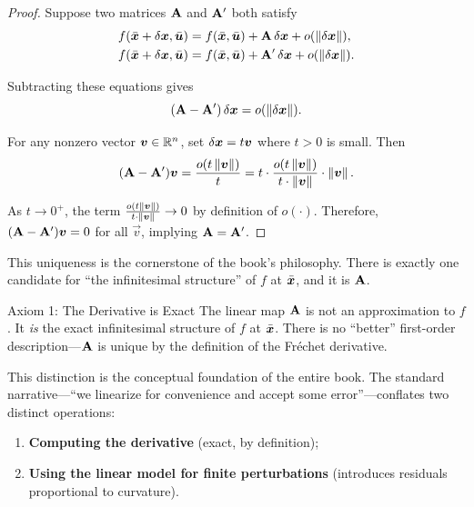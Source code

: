 \begin{proof}
Suppose two matrices $\mathbf{A}$ and $\mathbf{A}'$ both satisfy
\begin{align}
f(\bar{\bm{x}} + \delta\bm{x}, \bar{\bm{u}}) &= f(\bar{\bm{x}}, \bar{\bm{u}}) + \mathbf{A}\,\delta\bm{x} + o(\left\lVert \delta\bm{x} \right\rVert), \\
f(\bar{\bm{x}} + \delta\bm{x}, \bar{\bm{u}}) &= f(\bar{\bm{x}}, \bar{\bm{u}}) + \mathbf{A}'\,\delta\bm{x} + o(\left\lVert \delta\bm{x} \right\rVert).
\end{align}

Subtracting these equations gives
\begin{equation}
(\mathbf{A} - \mathbf{A}')\,\delta\bm{x} = o(\left\lVert \delta\bm{x} \right\rVert).
\label{eq:ch1:diff-matrices}
\end{equation}

For any nonzero vector $\bm{v} \in \mathbb{R}^n$, set $\delta\bm{x} = t\bm{v}$ where $t > 0$ is small.
Then
\begin{equation}
(\mathbf{A} - \mathbf{A}')\bm{v} = \frac{o(t\left\lVert \bm{v} \right\rVert)}{t} = t \cdot \frac{o(t\left\lVert \bm{v} \right\rVert)}{t \cdot \left\lVert \bm{v} \right\rVert} \cdot \left\lVert \bm{v} \right\rVert.
\end{equation}

As $t \to 0^+$, the term $\frac{o(t\left\lVert \bm{v} \right\rVert)}{t \cdot \left\lVert \bm{v} \right\rVert} \to 0$ by definition of $o(\cdot)$.
Therefore, $(\mathbf{A} - \mathbf{A}')\bm{v} = 0$ for all $\vec{v}$, implying $\mathbf{A} = \mathbf{A}'$.
\end{proof}

This uniqueness is the cornerstone of the book's philosophy. There is exactly one candidate
for ``the infinitesimal structure'' of $f$ at $\bar{\bm{x}}$, and it is $\mathbf{A}$.

\begin{axiombox}{Axiom 1: The Derivative is Exact}
The linear map $\mathbf{A}$ is not an approximation to $f$. It \emph{is} the exact
infinitesimal structure of $f$ at $\bar{\bm{x}}$. There is no ``better'' first-order
description---$\mathbf{A}$ is unique by the definition of the Fréchet derivative.
\end{axiombox}

This distinction is the conceptual foundation of the entire book. The standard
narrative---``we linearize for convenience and accept some error''---conflates two
distinct operations:
\begin{enumerate}
\item \textbf{Computing the derivative} (exact, by definition);
\item \textbf{Using the linear model for finite perturbations} (introduces residuals
      proportional to curvature).
\end{enumerate}

